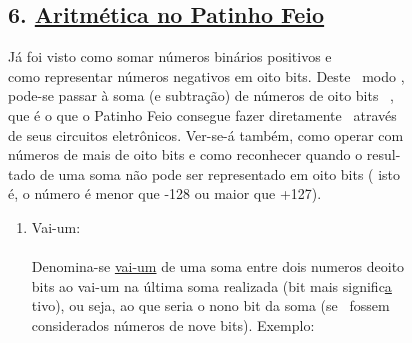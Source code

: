 \documentclass[a4paper,12pt]{article}
\begin{document}
\newpage

\subsection*{6. \uline{Aritmética no Patinho Feio}}

Já foi visto como somar números binários positivos e\\
como representar números negativos em oito bits. Deste \ modo ,\\
pode-se passar à soma (e subtração) de números de oito bits \ ,\\
que é o que o Patinho Feio consegue fazer diretamente \ através\\
de seus circuitos eletrônicos. Ver-se-á também, como operar com\\
números de mais de oito bits e como reconhecer quando o resul-\\
tado de uma soma não pode ser representado em oito bits ( isto\\
é, o número é menor que -128 ou maior que +127).\\

\begin{enumerate}[label=\alph*), align=left, leftmargin=1.5em, labelsep=-0.5em, itemsep=1em, topsep=1.5em]
\item Vai-um:\\
\\[-0.5em]
Denomina-se \uline{vai-um} de uma soma entre dois numeros de\hfill oito\\
bits ao vai-um na última soma realizada (bit mais signific\uline a\\
tivo), ou seja, ao que seria o nono bit da soma (se \ fossem\\
considerados números de nove bits). Exemplo:\\
\end{enumerate}
\end{document}
